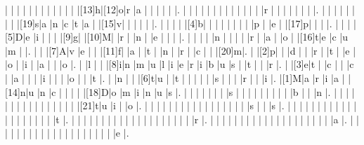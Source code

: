 \documentclass[12pt]{article}
\begin{document}
\begin{Puzzle}{22}{22}
  |{}  |{}  |{}  |{}  |{}  |{}  |{}  |{}  |{}  |{}  |{}  |{}  |[13]h|[12]o|r   |a   |{}  |{}  |{}  |{}  |{}  |.
  |{}  |{}  |{}  |{}  |{}  |{}  |{}  |{}  |{}  |{}  |{}  |{}  |{}  |r   |{}  |{}  |{}  |{}  |{}  |{}  |{}  |.
  |{}  |{}  |{}  |{}  |{}  |{}  |{}  |{}  |[19]s|a   |n   |c   |t   |a   |{}  |[15]v|{}  |{}  |{}  |{}  |{}  |.
  |{}  |{}  |{}  |{}  |[4]b|{}  |{}  |{}  |{}  |{}  |{}  |{}  |{}  |p   |{}  |e   |{}  |[17]p|{}  |{}  |{}  |.
  |{}  |{}  |{}  |[5]D|e   |i   |{}  |{}  |{}  |[9]g|{}  |[10]M|{}  |r   |{}  |n   |{}  |e   |{}  |{}  |{}  |.
  |{}  |{}  |{}  |{}  |n   |{}  |{}  |{}  |{}  |r   |{}  |a   |{}  |o   |{}  |[16]t|e   |c   |u   |m   |{}  |.
  |{}  |{}  |[7]A|v   |e   |{}  |{}  |[11]f|{}  |a   |{}  |t   |{}  |n   |{}  |r   |{}  |c   |{}  |{}  |[20]m|.
  |{}  |[2]p|{}  |{}  |d   |{}  |{}  |r   |{}  |t   |{}  |e   |{}  |o   |{}  |i   |{}  |a   |{}  |{}  |o   |.
  |{}  |l   |{}  |{}  |[8]i|n   |m   |u   |l   |i   |e   |r   |i   |b   |u   |s   |{}  |t   |{}  |{}  |r   |.
  |{}  |[3]e|t   |{}  |c   |{}  |{}  |c   |{}  |a   |{}  |{}  |{}  |i   |{}  |{}  |{}  |o   |{}  |{}  |t   |.
  |{}  |n   |{}  |{}  |[6]t|u   |{}  |t   |{}  |{}  |{}  |{}  |{}  |s   |{}  |{}  |{}  |r   |{}  |{}  |i   |.
  |[1]M|a   |r   |i   |a   |{}  |[14]n|u   |n   |c   |{}  |{}  |{}  |{}  |[18]D|o   |m   |i   |n   |u   |s   |.
  |{}  |{}  |{}  |{}  |{}  |{}  |{}  |s   |{}  |{}  |{}  |{}  |{}  |{}  |{}  |{}  |{}  |b   |{}  |{}  |n   |.
  |{}  |{}  |{}  |{}  |{}  |{}  |{}  |{}  |{}  |{}  |{}  |{}  |{}  |{}  |{}  |{}  |[21]t|u   |i   |{}  |o   |.
  |{}  |{}  |{}  |{}  |{}  |{}  |{}  |{}  |{}  |{}  |{}  |{}  |{}  |{}  |{}  |{}  |{}  |s   |{}  |{}  |s   |.
  |{}  |{}  |{}  |{}  |{}  |{}  |{}  |{}  |{}  |{}  |{}  |{}  |{}  |{}  |{}  |{}  |{}  |{}  |{}  |{}  |t   |.
  |{}  |{}  |{}  |{}  |{}  |{}  |{}  |{}  |{}  |{}  |{}  |{}  |{}  |{}  |{}  |{}  |{}  |{}  |{}  |{}  |r   |.
  |{}  |{}  |{}  |{}  |{}  |{}  |{}  |{}  |{}  |{}  |{}  |{}  |{}  |{}  |{}  |{}  |{}  |{}  |{}  |{}  |a   |.
  |{}  |{}  |{}  |{}  |{}  |{}  |{}  |{}  |{}  |{}  |{}  |{}  |{}  |{}  |{}  |{}  |{}  |{}  |{}  |{}  |e   |.
\end{Puzzle}
\end{document}

